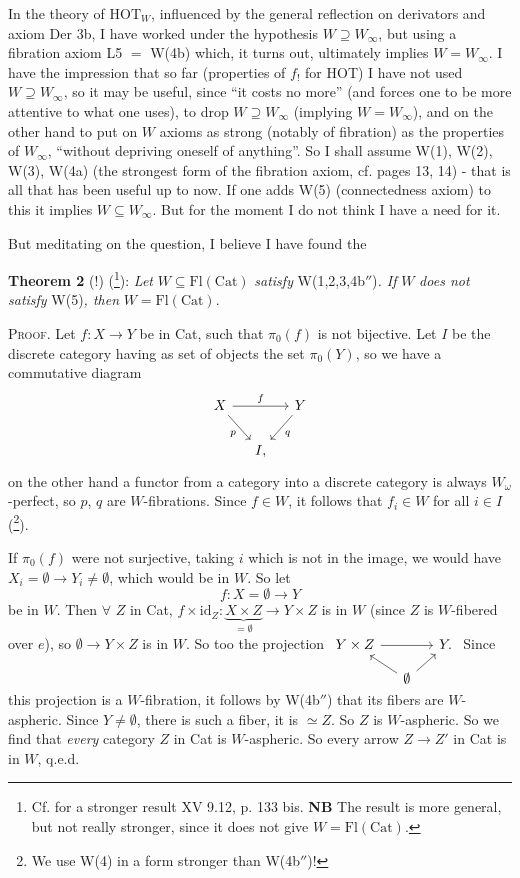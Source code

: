 \documentclass[11pt]{article}
\newcommand{\printedpage}[1]{\marginpar{\footnotesize p.~#1}}
\newcommand{\msp}[1]{\marginpar{\footnotesize [#1]}}
\newcommand{\Fl}{\mathrm{Fl}}
\newcommand{\Cat}{\mathrm{Cat}}
\begin{document}
\msp{page 20}In the theory of $\mathrm{HOT}_W$, influenced by the general reflection on derivators and axiom Der 3b, I have worked under the hypothesis $W \supseteq W_\infty$, but using a fibration axiom L5 $=$ W(4b) which, it turns out, ultimately implies $W = W_\infty$. I have the impression that so far (properties of $f_!$ for HOT) I have not used $W \supseteq W_\infty$, so it may be useful, since ``it costs no more'' (and forces one to be more attentive to what one uses), to drop $W \supseteq W_\infty$ (implying $W = W_\infty$), and on the other hand to put on $W$ axioms as strong (notably of fibration) as the properties of $W_\infty$, ``without depriving oneself of anything''. So I shall assume W(1), W(2), W(3), W(4a) (the strongest form of the fibration axiom, cf. pages 13, 14) - that is all that has been useful up to now. If one adds W(5) (connectedness axiom) to this it implies $W \subseteq W_\infty$. But for the moment I do not think I have a need for it.

But meditating on the question, I believe I have found the

\textbf{Theorem 2} (!) (\footnote[41]{Cf. for a stronger result XV 9.12, p. 133 bis. \textbf{NB} The result is more general, but not really stronger, since it does not give $W = \Fl(\Cat)$.}): \textit{Let} $W \subseteq \Fl(\Cat)$ \textit{satisfy} W(1,2,3,4b$''$)\textit{. If} $W$ \textit{does not satisfy} W(5)\textit{, then} $W = \Fl(\Cat)$.

\textsc{Proof}. Let $f : X \longrightarrow Y$ be in Cat, such that $\pi_0(f)$ is not bijective. Let $I$ be the discrete category having as set of objects the set $\pi_0(Y)$, so we have a commutative diagram
\[
\begin{tikzcd}[column sep=small]
X \arrow[rr, "f"] \arrow[dr, "p"'] & & Y \arrow[dl, "q"] \\
& I, &
\end{tikzcd}
\]
on the other hand a functor from a category into a discrete category is always $W_\omega$-perfect, so $p$, $q$ are $W$-fibrations. Since\msp{page 21} $f \in W$, it follows that $f_i \in W$ for all $i \in I$ (\footnote[42]{We use W(4) in a form stronger than W(4b$''$)!}).

If $\pi_0(f)$ were not surjective, taking $i$ which is not in the image, we would have $X_i = \emptyset \longrightarrow Y_i \neq \emptyset$, which would be in $W$. So let
\[
f : X = \emptyset \longrightarrow Y
\]
be in $W$. Then $\forall$ $Z$ in Cat, $f \times \mathrm{id}_Z : \underbrace{X \times Z}_{= \emptyset} \longrightarrow Y \times Z$ is in $W$ (since $Z$ is
\printedpage{18}
$W$-fibered over $e$), so $\emptyset \longrightarrow Y \times Z$ is in $W$. So too the projection
$\begin{tikzcd}[column sep=small, row sep=small, baseline=(\tikzcdmatrixname-1-1.base)]
Y \times Z \arrow[rr] & & Y. \\
& \emptyset \arrow[ul] \arrow[ur] &
\end{tikzcd}$
Since this projection is a $W$-fibration, it follows by W(4b$''$) that its fibers are $W$-aspheric. Since $Y \neq \emptyset$, there is such a fiber, it is $\simeq Z$. So $Z$ is $W$-aspheric. So we find that \textit{every} category $Z$ in Cat is $W$-aspheric. So every arrow $Z \longrightarrow Z'$ in Cat is in $W$, q.e.d.
\end{document}
